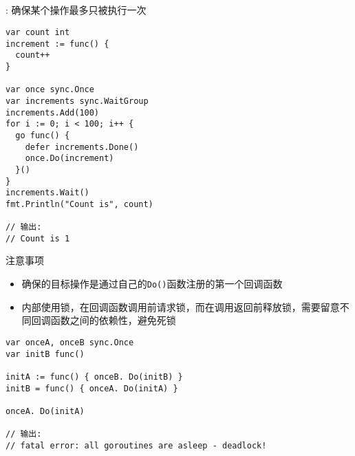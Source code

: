 \subsection{\Once }
\begin{frame}[fragile]{\Once }
  : 确保某个操作最多只被执行一次
  \iffalse
\begin{columns}[T]
    \column{.45\textwidth}    
\begin{lstlisting}[caption={\Once 使用样例},xleftmargin=8pt]
var count int
increment := func() {
  count++
}

var once sync.Once
var increments sync.WaitGroup

increments.Add(100)
for i := 0; i < 100; i++ {
  go func() {
    defer increments.Done()
    once.Do(increment)
  }()
}
\end{lstlisting}

    \column{.5\textwidth}    
\begin{lstlisting}[caption={\Once 使用样例},firstnumber=last,xleftmargin=8pt]
increments.Wait()
fmt.Println("Count is", count)

// 输出:
// Count is 1    
\end{lstlisting}
\end{columns}
\fi
\begin{lstlisting}[caption={\Once 使用样例},xleftmargin=8pt]
var count int
increment := func() {
  count++
}

var once sync.Once
var increments sync.WaitGroup
increments.Add(100)
for i := 0; i < 100; i++ {
  go func() {
    defer increments.Done()
    once.Do(increment)
  }()
}
increments.Wait()
fmt.Println("Count is", count)

// 输出:
// Count is 1    
\end{lstlisting}
\end{frame}

\begin{frame}[fragile]{注意事项}
  \begin{itemize}
      \item \alert{\Once 确保的目标操作是通过自己的\texttt{Do()}函数注册的\alert{第一个}回调函数}
      \item\pause \Once 内部使用锁，在回调函数调用前请求锁，而在调用返回前释放锁，需要留意不同回调函数之间的依赖性，避免死锁
  \end{itemize}  

\begin{lstlisting}[caption={\Once 的使用不当导致死锁}]
var onceA, onceB sync.Once
var initB func()

initA := func() { onceB. Do(initB) }
initB = func() { onceA. Do(initA) }

onceA. Do(initA)    

// 输出:
// fatal error: all goroutines are asleep - deadlock!
\end{lstlisting}
\end{frame}